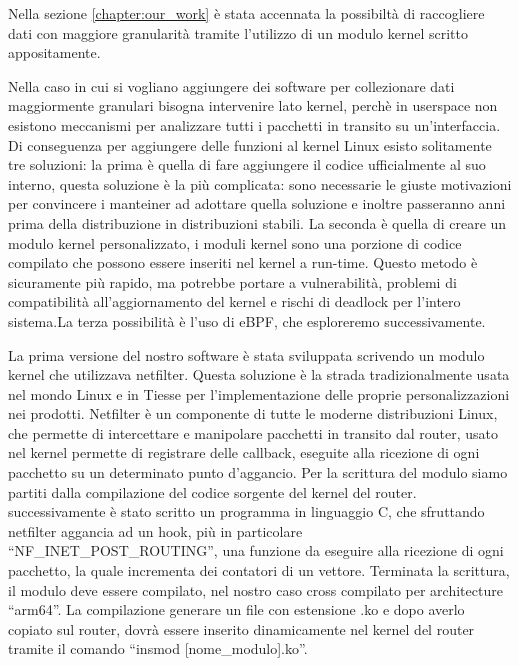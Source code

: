 Nella sezione \ref{chapter:our_work} è stata accennata la possibiltà di raccogliere dati con maggiore granularità tramite l'utilizzo di un modulo kernel scritto appositamente.

Nella caso in cui si vogliano aggiungere dei software per collezionare dati maggiormente granulari bisogna intervenire lato kernel, perchè in userspace non esistono meccanismi per analizzare tutti i pacchetti in transito su un'interfaccia. Di conseguenza per aggiungere delle funzioni al kernel Linux esisto solitamente tre soluzioni: la prima è quella di fare aggiungere il codice ufficialmente al suo interno, questa soluzione è la più complicata: sono necessarie le giuste motivazioni per convincere i manteiner ad adottare quella soluzione e inoltre passeranno anni prima della distribuzione in distribuzioni stabili. La seconda è quella di creare un modulo kernel personalizzato, i moduli kernel sono una porzione di codice compilato che possono essere inseriti nel kernel a run-time. Questo metodo è sicuramente più rapido, ma potrebbe portare a vulnerabilità, problemi di compatibilità all'aggiornamento del kernel e rischi di deadlock per l'intero sistema.La terza possibilità è l'uso di eBPF, che esploreremo successivamente.

La prima versione del nostro software è stata sviluppata scrivendo un modulo kernel che utilizzava netfilter. Questa soluzione è la strada tradizionalmente usata nel mondo Linux e in Tiesse per l'implementazione delle proprie personalizzazioni nei prodotti.
Netfilter è un componente di tutte le moderne distribuzioni Linux, che permette di intercettare e manipolare pacchetti in transito dal router, usato nel kernel permette di registrare delle callback, eseguite alla ricezione di ogni pacchetto su un determinato punto d'aggancio.
Per la scrittura del modulo siamo partiti dalla compilazione del codice sorgente del kernel del router. successivamente è stato scritto un programma in linguaggio C, che sfruttando netfilter aggancia ad un hook, più in particolare ``NF\_INET\_POST\_ROUTING'', una funzione da eseguire alla ricezione di ogni pacchetto, la quale incrementa dei contatori di un vettore.
Terminata la scrittura, il modulo deve essere compilato, nel nostro caso cross compilato per architecture ``arm64''. La compilazione generare un file con estensione .ko e dopo averlo copiato sul router, dovrà essere inserito dinamicamente nel kernel del router tramite il comando ``insmod [nome\_modulo].ko''.

